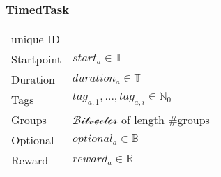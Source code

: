 \subsubsection{TimedTask}
\begin{tabular}{|p{3.5cm}||p{5cm}|}
\hline
   unique ID    &  \\
   Startpoint   & $start_a\in\mathbb{T}$ \\
   Duration  	& $duration_a\in\mathbb{T}$ \\
   Tags         & $tag_{a,1},...,tag_{a,i}\in\mathbb{N}_0$ \\	
   Groups       & $\mathcal{Bitvector}$ of length \#groups \\ 
   Optional     & $optional_a\in\mathbb{B}$\\
   Reward		& $reward_a \in \mathbb{R}$\\
\hline
\end{tabular}